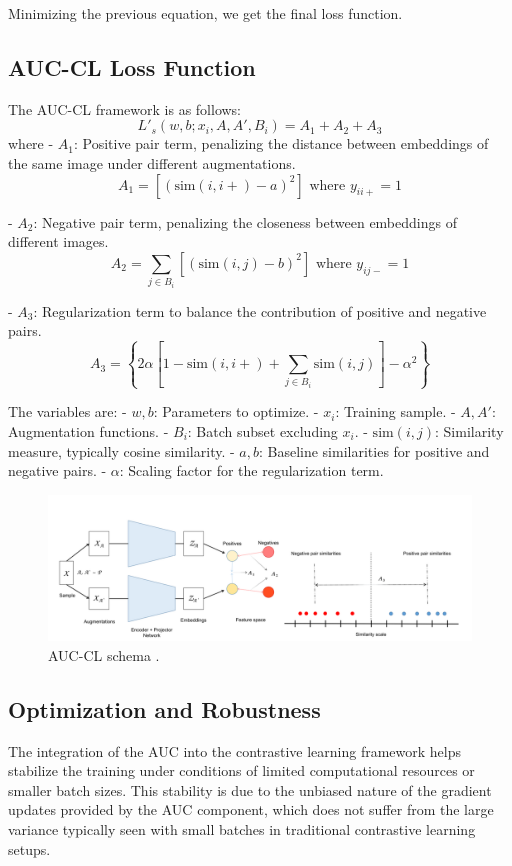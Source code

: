 Minimizing the previous equation, we get the final loss function.

\subsection{AUC-CL Loss Function}
The AUC-CL framework is as follows:
\[
L'_s(w, b; x_i, A, A', B_i) = A_1 + A_2 + A_3
\]
where
- \(A_1\): Positive pair term, penalizing the distance between embeddings of the same image under different augmentations.
  \[
  A_1 = \left[ (\text{sim}(i, i+) - a)^2 \right] \text{ where } y_{ii+} = 1
  \]

- \(A_2\): Negative pair term, penalizing the closeness between embeddings of different images.
  \[
  A_2 = \sum_{j \in B_i} \left[ (\text{sim}(i, j) - b)^2 \right] \text{ where } y_{ij-} = 1
  \]

- \(A_3\): Regularization term to balance the contribution of positive and negative pairs.
  \[
  A_3 = \left\{ 2\alpha \left[ 1 - \text{sim}(i, i+) + \sum_{j \in B_i} \text{sim}(i, j) \right] - \alpha^2 \right\}
  \]

The variables are:
- \(w, b\): Parameters to optimize.
- \(x_i\): Training sample.
- \(A, A'\): Augmentation functions.
- \(B_i\): Batch subset excluding \(x_i\).
- \(\text{sim}(i, j)\): Similarity measure, typically cosine similarity.
- \(a, b\): Baseline similarities for positive and negative pairs.
- \(\alpha\): Scaling factor for the regularization term.


\begin{figure}[hbt]
\centering
\includegraphics[width=\textwidth]{figs/auc-cl.png}
\caption{
AUC-CL schema \cite{sharma2023auc}.
}
\label{fig:secex}
\end{figure}

\subsection{Optimization and Robustness}
The integration of the AUC into the contrastive learning framework helps stabilize the training under conditions of limited computational resources or smaller batch sizes. This stability is due to the unbiased nature of the gradient updates provided by the AUC component, which does not suffer from the large variance typically seen with small batches in traditional contrastive learning setups.
